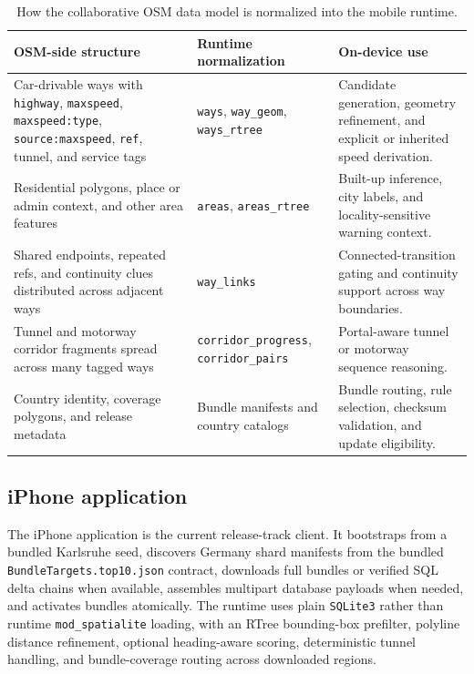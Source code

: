 \documentclass{article}
\begin{document}
\begin{table}[!htbp]
\centering
\scriptsize
\caption{How the collaborative OSM data model is normalized into the mobile runtime.}
\label{tab:osm_runtime_mapping}
\begin{tabular}{p{3.0cm}p{4.2cm}p{3.8cm}}
\toprule
OSM-side structure & Runtime normalization & On-device use \\
\midrule
Car-drivable ways with \texttt{highway}, \texttt{maxspeed}, \texttt{maxspeed:type}, \texttt{source:maxspeed}, \texttt{ref}, tunnel, and service tags & \texttt{ways}, \texttt{way\_geom}, \texttt{ways\_rtree} & Candidate generation, geometry refinement, and explicit or inherited speed derivation. \\
Residential polygons, place or admin context, and other area features & \texttt{areas}, \texttt{areas\_rtree} & Built-up inference, city labels, and locality-sensitive warning context. \\
Shared endpoints, repeated refs, and continuity clues distributed across adjacent ways & \texttt{way\_links} & Connected-transition gating and continuity support across way boundaries. \\
Tunnel and motorway corridor fragments spread across many tagged ways & \texttt{corridor\_progress}, \texttt{corridor\_pairs} & Portal-aware tunnel or motorway sequence reasoning. \\
Country identity, coverage polygons, and release metadata & Bundle manifests and country catalogs & Bundle routing, rule selection, checksum validation, and update eligibility. \\
\bottomrule
\end{tabular}
\end{table}

\subsection{iPhone application}
The iPhone application is the current release-track client. It bootstraps from a bundled Karlsruhe seed, discovers Germany shard manifests from the bundled \texttt{BundleTargets.top10.json} contract, downloads full bundles or verified SQL delta chains when available, assembles multipart database payloads when needed, and activates bundles atomically. The runtime uses plain \texttt{SQLite3} rather than runtime \texttt{mod\_spatialite} loading, with an RTree bounding-box prefilter, polyline distance refinement, optional heading-aware scoring, deterministic tunnel handling, and bundle-coverage routing across downloaded regions.
\end{document}
